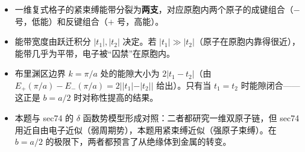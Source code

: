 \begin{insightbox}[物理图像]
\begin{itemize}
    \item 一维复式格子的紧束缚能带分裂为\textbf{两支}，对应原胞内两个原子的成键组合（$-$ 号，低能）和反键组合（$+$ 号，高能）。
    \item 能带宽度由跃迁积分 $|t_1|,|t_2|$ 决定。若 $|t_1|\gg|t_2|$（原子在原胞内靠得很近），能带几乎为平带，电子被``囚禁''在原胞内。
    \item 布里渊区边界 $k=\pi/a$ 处的能隙大小为 $2|t_1-t_2|$（由 $E_+(\pi/a)-E_-(\pi/a)=2||t_1|-|t_2||$ 给出）。只有当 $t_1=t_2$ 时能隙闭合——这正是 $b=a/2$ 时对称性提高的结果。
    \item 本题与 sec74 的 $\delta$ 函数势模型形成对照：二者都研究一维双原子链，但 sec74 用近自由电子近似（弱周期势），本题用紧束缚近似（强原子束缚）。在 $b=a/2$ 的极限下，两者都预言了从绝缘体到金属的转变。
\end{itemize}
\end{insightbox}
